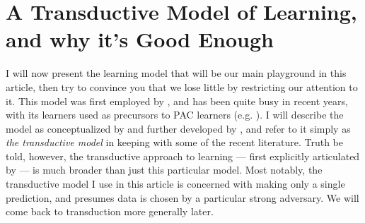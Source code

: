 \section{A Transductive Model of Learning, and why it's Good Enough}
\label{sec:trans}

I will now present the learning model that will be our main playground in this article, then try to convince you that we lose little by restricting our attention to it. This model was first employed by \citet{haussler_predicting_1994}, and has been quite busy in recent years, with its learners used as precursors to PAC learners (e.g. \cite{daniely_optimal_2014,brukhim_characterization_2022,aden-ali_optimal_2023,daskalakis_is_2024,asilis_regularization_2024,montasser_adversarially_2022}).
%
I will describe the model as conceptualized by \citet{daniely_optimal_2014} and further developed by  \citet{asilis_regularization_2024}, and refer to it simply as \emph{the transductive model}  in keeping with some of the recent literature.   %
%
Truth be told, however,  the transductive approach to learning --- first explicitly articulated by \citet[Chapter 6.1]{vapnik_nature_1998} --- is much broader than just this particular model. Most notably, the transductive model I use in this article is concerned with making only a single prediction, and presumes data is chosen by a particular strong adversary. We will come back to transduction more generally later.   %

